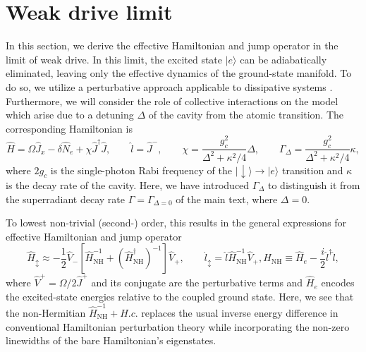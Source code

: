 \section{Weak drive limit}
\label{sec:weak}

In this section, we derive the effective Hamiltonian and jump operator in the limit of weak drive. In this limit, the excited state $|e\rangle$ can be adiabatically eliminated, leaving only the effective dynamics of the ground-state manifold. To do so, we utilize a perturbative approach applicable to dissipative systems \cite{Reiter2012}. Furthermore, we will consider the role of collective interactions on the model which arise due to a detuning $\Delta$ of the cavity from the atomic transition. The corresponding Hamiltonian is
\begin{equation}
    \hat H = \Omega \hat J_x - \delta \hat N_e + \chi \hat J^\dagger \hat J, \qquad \hat l = \hat J^-, \qquad \chi = \frac{g_c^2}{\Delta^2+\kappa^2/4} \Delta, \qquad \Gamma_{\Delta} = \frac{g_c^2}{\Delta^2+\kappa^2/4} \kappa, 
\end{equation}
where $2 g_c$ is the single-photon Rabi frequency of the $|{\downarrow}\rangle \to |e\rangle$ transition and $\kappa$ is the decay rate of the cavity. Here, we have introduced $\Gamma_{\Delta}$ to distinguish it from the superradiant decay rate $\Gamma = \Gamma_{\Delta = 0}$ of the main text, where $\Delta = 0$.

To lowest non-trivial (second-) order, this results in the general expressions for effective Hamiltonian and jump operator 
\begin{subequations}
\begin{equation}
    \hat H_\updownarrow \approx - \frac{1}{2} \hat V_- [\hat H_{{{\text{NH}}}}^{-1} + (\hat H_{{{\text{NH}}}}^\dagger)^{-1}]\hat V_+, \qquad \hat l_\updownarrow = \hat l \hat H_{{{\text{NH}}}}^{-1} \hat V_+,
\end{equation}
\begin{equation}
    \hat H_{\text{NH}} \equiv \hat H_e - \frac{i}{2} \hat l^\dagger \hat l,
\end{equation}
\end{subequations}
where $\hat V^+ = \Omega/2 \hat J^+$ and its conjugate are the perturbative terms and $\hat H_e$ encodes the excited-state energies relative to the coupled ground state. Here, we see that the non-Hermitian $\hat{H}_{\text{NH}}^{-1} + H.c.$ replaces the usual inverse energy difference in conventional Hamiltonian perturbation theory while incorporating the non-zero linewidths of the bare Hamiltonian's eigenstates.

